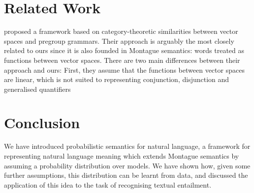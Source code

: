 \documentclass[letterpaper]{article}
\newcommand{\citet}[1]{\citeauthor{#1} \shortcite{#1}}
\begin{document}
\section{Related Work}


\citet{Coecke:10} proposed a framework based on category-theoretic
similarities between vector spaces and pregroup grammars. Their
approach is arguably the most closely related to ours since it is also
founded in Montague semantics: words treated as functions between
vector spaces. There are two main differences between their approach
and ours: First, they assume that the functions between vector
spaces are linear, which is not suited to representing conjunction,
disjunction and generalised quantifiers \cite{}


\section{Conclusion}

We have introduced probabilistic semantics for natural language, a
framework for representing natural language meaning which extends
Montague semantics by assuming a probability distribution over
models. We have shown how, given some further assumptions, this
distribution can be learnt from data, and discussed the application of
this idea to the task of recognising textual entailment.




\end{document}
